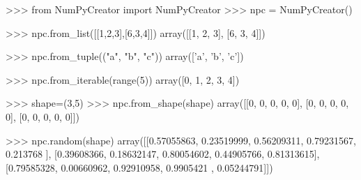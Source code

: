 \documentclass[]{article}
\newenvironment{Shaded}{\begin{snugshade}}{\end{snugshade}}
\newcommand{\BuiltInTok}[1]{\textcolor[rgb]{0.50,0.55,0.55}{#1}}
\newcommand{\DecValTok}[1]{\textcolor[rgb]{0.96,0.45,0.00}{#1}}
\newcommand{\FloatTok}[1]{\textcolor[rgb]{0.96,0.45,0.00}{#1}}
\newcommand{\ImportTok}[1]{\textcolor[rgb]{0.15,0.68,0.38}{#1}}
\newcommand{\NormalTok}[1]{\textcolor[rgb]{0.81,0.81,0.76}{#1}}
\newcommand{\OperatorTok}[1]{\textcolor[rgb]{0.81,0.81,0.76}{#1}}
\newcommand{\StringTok}[1]{\textcolor[rgb]{0.96,0.31,0.31}{#1}}
\begin{document}
\begin{Shaded}
\begin{Highlighting}[]
\OperatorTok{>>>} \ImportTok{from}\NormalTok{ NumPyCreator }\ImportTok{import}\NormalTok{ NumPyCreator}
\OperatorTok{>>>}\NormalTok{ npc }\OperatorTok{=}\NormalTok{ NumPyCreator()}

\OperatorTok{>>>}\NormalTok{ npc.from_list([[}\DecValTok{1}\NormalTok{,}\DecValTok{2}\NormalTok{,}\DecValTok{3}\NormalTok{],[}\DecValTok{6}\NormalTok{,}\DecValTok{3}\NormalTok{,}\DecValTok{4}\NormalTok{]])}
\NormalTok{array([[}\DecValTok{1}\NormalTok{, }\DecValTok{2}\NormalTok{, }\DecValTok{3}\NormalTok{],}
\NormalTok{       [}\DecValTok{6}\NormalTok{, }\DecValTok{3}\NormalTok{, }\DecValTok{4}\NormalTok{]])}

\OperatorTok{>>>}\NormalTok{ npc.from_tuple((}\StringTok{"a"}\NormalTok{, }\StringTok{"b"}\NormalTok{, }\StringTok{"c"}\NormalTok{))}
\NormalTok{array([}\StringTok{'a'}\NormalTok{, }\StringTok{'b'}\NormalTok{, }\StringTok{'c'}\NormalTok{])}

\OperatorTok{>>>}\NormalTok{ npc.from_iterable(}\BuiltInTok{range}\NormalTok{(}\DecValTok{5}\NormalTok{))}
\NormalTok{array([}\DecValTok{0}\NormalTok{, }\DecValTok{1}\NormalTok{, }\DecValTok{2}\NormalTok{, }\DecValTok{3}\NormalTok{, }\DecValTok{4}\NormalTok{])}

\OperatorTok{>>>}\NormalTok{ shape}\OperatorTok{=}\NormalTok{(}\DecValTok{3}\NormalTok{,}\DecValTok{5}\NormalTok{)}
\OperatorTok{>>>}\NormalTok{ npc.from_shape(shape)}
\NormalTok{array([[}\DecValTok{0}\NormalTok{, }\DecValTok{0}\NormalTok{, }\DecValTok{0}\NormalTok{, }\DecValTok{0}\NormalTok{, }\DecValTok{0}\NormalTok{],}
\NormalTok{       [}\DecValTok{0}\NormalTok{, }\DecValTok{0}\NormalTok{, }\DecValTok{0}\NormalTok{, }\DecValTok{0}\NormalTok{, }\DecValTok{0}\NormalTok{],}
\NormalTok{       [}\DecValTok{0}\NormalTok{, }\DecValTok{0}\NormalTok{, }\DecValTok{0}\NormalTok{, }\DecValTok{0}\NormalTok{, }\DecValTok{0}\NormalTok{]])}

\OperatorTok{>>>}\NormalTok{ npc.random(shape)}
\NormalTok{array([[}\FloatTok{0.57055863}\NormalTok{, }\FloatTok{0.23519999}\NormalTok{, }\FloatTok{0.56209311}\NormalTok{, }\FloatTok{0.79231567}\NormalTok{, }\FloatTok{0.213768}\NormalTok{  ],}
\NormalTok{      [}\FloatTok{0.39608366}\NormalTok{, }\FloatTok{0.18632147}\NormalTok{, }\FloatTok{0.80054602}\NormalTok{, }\FloatTok{0.44905766}\NormalTok{, }\FloatTok{0.81313615}\NormalTok{],}
\NormalTok{      [}\FloatTok{0.79585328}\NormalTok{, }\FloatTok{0.00660962}\NormalTok{, }\FloatTok{0.92910958}\NormalTok{, }\FloatTok{0.9905421}\NormalTok{ , }\FloatTok{0.05244791}\NormalTok{]])}


\end{Highlighting}
\end{Shaded}
\end{document}
